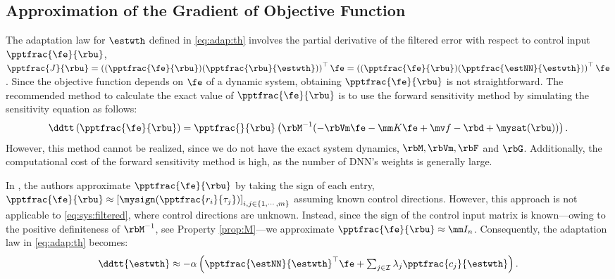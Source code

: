 \documentclass[journal]{IEEEtran}
\begin{document}
\subsection{Approximation of the Gradient of Objective Function}

The adaptation law for $\estwth$ defined in \eqref{eq:adap:th} involves the partial derivative of the filtered error with respect to control input $\pptfrac{\fe}{\rbu}$, \ie 
$
    \pptfrac{J}{\rbu}
    =
    \left(
        (\pptfrac{\fe}{\rbu})
        (\pptfrac{\rbu}{\estwth})
    \right)
    ^\top \fe
    =
    \left(
        (\pptfrac{\fe}{\rbu})
        (\pptfrac{\estNN}{\estwth})
    \right)
    ^\top \fe
$. 
Since the objective function depends on $\fe$ of a dynamic system, obtaining $\pptfrac{\fe}{\rbu}$ is not straightforward. 
The recommended method to calculate the exact value of $\pptfrac{\fe}{\rbu}$ is to use the forward sensitivity method \cite{Sengupta:2014aa} by simulating the sensitivity equation as follows: 
\begin{equation}
    \ddtt 
    \left(
        \pptfrac{\fe}{\rbu}
    \right)
    =
    \pptfrac{}{
        \rbu
    }
    \left(
        \rbM^{-1}(
            -\rbVm \fe
            -\mm K \fe
            + \mv f
            -\rbd + \mysat(\rbu)
        )
    \right)
    .
\end{equation}
However, this method cannot be realized, since we do not have the exact system dynamics, \ie $\rbM,\rbVm, \rbF$ and $ \rbG$.
Additionally, the computational cost of the forward sensitivity method is high, as the number of DNN's weights is generally large.

In \cite{Douratsos:2007aa,Saerens:1991aa}, the authors approximate $\pptfrac{\fe}{\rbu}$ by taking the sign of each entry, \ie
$
    \pptfrac{\fe}{\rbu}
    \approx
    \left[
        \mysign(\pptfrac{r_i}{\tau_j})
    \right]_{i,j\in\{1,\cdots,m\}}
$ 
assuming known control directions.
However, this approach is not applicable to \eqref{eq:sys:filtered}, where control directions are unknown.
Instead, since the sign of the control input matrix is known—owing to the positive definiteness of $\rbM^{-1}$, see Property \ref{prop:M}—we approximate $\pptfrac{\fe}{\rbu}\approx \mm I_n$.
Consequently, the adaptation law in \eqref{eq:adap:th} becomes:
\begin{equation}
    \ddtt{\estwth}
    \approx
    -\alpha 
    \left(
        \pptfrac{\estNN}
        {\estwth}^\top
        \fe
        +
        \textstyle\sum_{j\in\mathcal{I}}
        \lambda_j 
        \pptfrac{c_j}{\estwth}
    \right)
    .
    \label{eq:adap:th:approx}
\end{equation}
\end{document}

